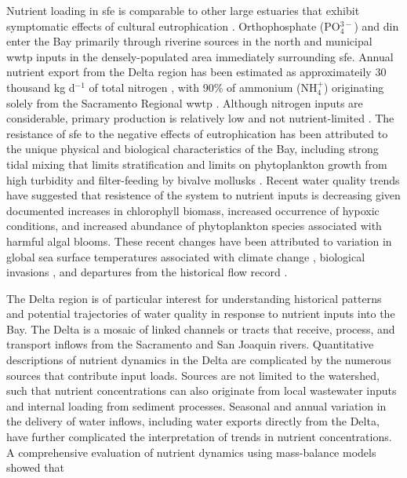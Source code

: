 \documentclass[letterpaper,12pt,oneside]{article}\usepackage[]{graphicx}\usepackage[]{color}
\begin{document}
Nutrient loading in \ac{sfe} is comparable to other large estuaries that exhibit symptomatic effects of cultural eutrophication \citep[e.g., Chesapeake Bay,][]{Kemp05}.  Orthophosphate (PO$_4^{3-}$) and \ac{din} enter the Bay primarily through riverine sources in the north and municipal \ac{wwtp} inputs in the densely-populated area immediately surrounding \ac{sfe}.  Annual nutrient export from the Delta region has been estimated as approximateily 30 thousand kg d$^{-1}$ of total nitrogen \citep[varying with flow,][]{Novick15}, with 90\% of ammonium (NH$_4^{+}$) originating solely from the Sacramento Regional \ac{wwtp} \citep{Jassby08}.  Although nitrogen inputs are considerable, primary production is relatively low and not nutrient-limited \citep{Jassby02,Kimmerer12}.  The resistance of \ac{sfe} to the negative effects of eutrophication has been attributed to the unique physical and biological characteristics of the Bay, including strong tidal mixing that limits stratification \citep{Cloern96,Thompson08} and limits on phytoplankton growth from high turbidity and filter-feeding by bivalve mollusks \citep{Thompson08,Crauder16}.  Recent water quality trends have suggested that resistence of the system to nutrient inputs is decreasing given documented increases in chlorophyll biomass, increased occurrence of hypoxic conditions, and increased abundance of phytoplankton species associated with harmful algal blooms.  These recent changes have been attributed to variation in global sea surface temperatures associated with climate change \citep{Cloern07}, biological invasions \citep{Cohen98}, and departures from the historical flow record \citep{Enright09,Cloern12}.  

The Delta region is of particular interest for understanding historical patterns and potential trajectories of water quality in response to nutrient inputs into the Bay.  The Delta is a mosaic of linked channels or tracts that receive, process, and transport inflows from the Sacramento and San Joaquin rivers.  Quantitative descriptions of nutrient dynamics in the Delta are complicated by the numerous sources that contribute input loads.  Sources are not limited to the watershed, such that nutrient concentrations can also originate from local wastewater inputs and internal loading from sediment processes.  Seasonal and annual variation in the delivery of water inflows, including water exports directly from the Delta, have further complicated the interpretation of trends in nutrient concentrations. A comprehensive evaluation of nutrient dynamics using mass-balance models showed that
\end{document}

